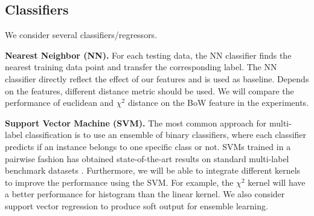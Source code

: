 \documentclass{article} %
\begin{document}

\subsection{Classifiers}
We consider several classifiers/regressors.

\textbf{Nearest Neighbor (NN).} For each testing data, the NN classifier finds the nearest training data point and transfer the corresponding label. The NN classifier directly reflect the effect of our features and is used as baseline. Depends on the features, different distance metric should be used. We will compare the performance of euclidean and $\chi^2$ distance on the BoW feature in the experiments.

\textbf{Support Vector Machine (SVM).} The most common approach for multi-label classification is to use an ensemble of binary classifiers, where each classifier predicts if an instance belongs to
one specific class or not. SVMs trained in a pairwise fashion has obtained state-of-the-art results on standard multi-label benchmark datasets \cite{Mencia_NIPSW13}. Furthermore, we will be able to integrate different kernels to improve the performance using the SVM. For example, the $\chi^2$ kernel will have a better performance for histogram than the linear kernel. We also consider support vector regression to produce soft output for ensemble learning.
\end{document}
